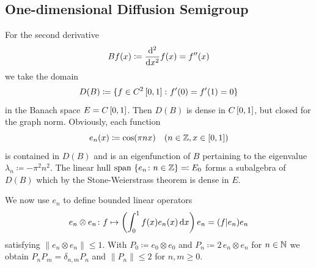 \subsection{One-dimensional Diffusion Semigroup}\label{subsec:a1-2.7}%
For the second derivative 
\[
    Bf(x) \coloneq \frac{\mathrm{d}^{2}}{\mathop{}\!\mathrm{d}{x}^{2}}f(x) = f''(x)
\]
we take the domain
\[
    D(B) \coloneq \{f \in C^{2}\left[ 0,1 \right] \colon f'(0) = f'(1) = 0\}
\]
in the Banach space $E = C\left[ 0,1 \right]$.
Then $D(B)$ is dense in $C\left[ 0,1 \right]$, but closed for the graph norm.
Obviously, each function
\[
    e_{n}(x) \coloneq \cos(\pi nx) \quad (n \in \mathbb{Z}, x \in \left[ 0,1 \right])
\]
is contained in $D(B)$ and is an eigenfunction of\/ $B$ pertaining to the eigenvalue $\lambda_{n} \coloneq -\pi^{2}n^{2}$.
The linear hull $\text{span }\{e_{n} \colon n \in \mathbb{Z}\} \eqqcolon E_{0}$ forms a subalgebra of\/ $D(B)$ which by the Stone-Weierstrass theorem is dense in $E$.

We now use $e_{n}$ to define bounded linear operators 
\[
	e_{n} \otimes e_{n} \colon f \mapsto \left(\int_{0}^{1} f(x)e_{n}(x) \dx \right)e_{n} 
		= ( f | e_{n} ) e_{n} %
\]
satisfying $\|e_{n} \otimes e_{n}\| \leq 1$.
With $P_{0} \coloneq e_{0} \otimes e_{0}$ and $P_{n} \coloneq 2\, e_{n} \otimes e_{n}$ for $n \in \mathbb{N}$ we obtain $P_{n}P_{m} = \delta_{n,m}P_{n}$ and $\|P_{n}\| \leq 2$ for $n, m \geq 0$.

